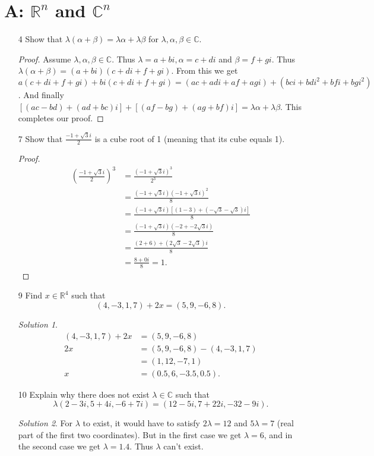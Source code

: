 \documentclass[11pt, b5paper, draft, fleqn]{book}
\theoremstyle{remark}
\newtheorem*{solution}{Solution}
\theoremstyle{definition}
\begin{document}
\section{A: \(\mathbb{R}^n\) and \(\mathbb{C}^n\)}
\begin{enumerate}
    \item[4]
	Show that \(\lambda(\alpha + \beta) = \lambda\alpha + \lambda\beta\) for \(\lambda, \alpha, \beta \in \mathbb{C}\).
	\begin{proof}
		Assume \(\lambda, \alpha, \beta \in \mathbb{C}\). Thus \(\lambda = a+bi, \alpha = c+di\) and \(\beta = f+gi\). Thus \(\lambda(\alpha + \beta) = (a+bi)(c+di + f+gi)\). From this we get \(a(c+di + f+gi) + bi(c+di + f+gi) = (ac + adi + af+ agi) + (bci + bdi^2 +bfi + bgi^2)\). And finally \(\left[(ac - bd) + (ad + bc)i\right] + \left[(af - bg) + (ag + bf)i\right] = \lambda\alpha + \lambda\beta\). This completes our proof.
	\end{proof}
	\item[7] Show that \(\frac{-1+\sqrt{3}i}{2}\) is a cube root of 1 (meaning that its cube equals 1).
	\begin{proof}
		\begin{equation*}
		\begin{split}
			\left(\frac{-1 + \sqrt{3}i}{2}\right)^3 & = \frac{(-1 + \sqrt{3}i)^3}{2^3} \\
			& = \frac{(-1 + \sqrt{3}i) (-1 + \sqrt{3}i)^2}{8} \\
			& = \frac{(-1 + \sqrt{3}i)\left[(1 - 3)+(-\sqrt{3} - \sqrt{3})i\right]}{8} \\
			& = \frac{(-1 + \sqrt{3}i) (-2 + -2\sqrt{3}i)}{8} \\
			& = \frac{(2 + 6) + (2\sqrt{3}-2\sqrt{3})i}{8} \\
			& = \frac{8 + 0i}{8} = 1.
		\end{split}
		\end{equation*}
	\end{proof}
	\item[9] Find \(x \in \mathbb{R}^4\) such that \[(4, -3, 1, 7) + 2x = (5, 9, -6, 8).\]
	\begin{solution}
		\begin{equation*}
		\begin{split}
			(4, -3, 1, 7) + 2x & = (5, 9, -6, 8) \\
			2x & = (5, 9, -6, 8) - (4, -3, 1, 7) \\
			& = (1, 12, -7, 1) \\
			x & = (0.5, 6, -3.5, 0.5).
		\end{split}
		\end{equation*}
	\end{solution}
	\item[10] Explain why there does not exist \(\lambda \in \mathbb{C}\) such that \[\lambda(2 - 3i, 5 + 4i, -6 + 7i) = (12 - 5i, 7 + 22i, -32 - 9i).\]
	\begin{solution}
		For \(\lambda\) to exist, it would have to satisfy \(2 \lambda = 12\) and \(5 \lambda = 7\) (real part of the first two coordinates). But in the first case we get \(\lambda = 6\), and in the second case we get \(\lambda = 1.4\). Thus \(\lambda\) can't exist.
	\end{solution}
\end{enumerate}
\end{document}

